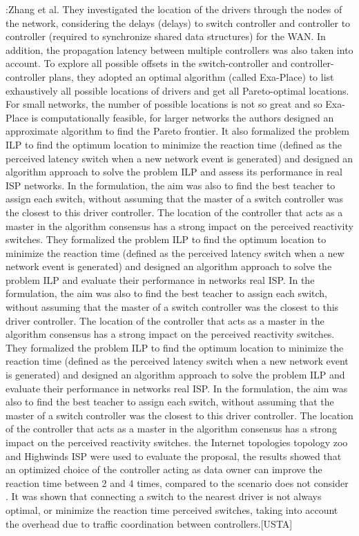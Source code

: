 \documentclass[a4paper,10pt]{article}
\begin{document}
\cite{ZhGi17}:Zhang et al. They investigated the location of the drivers through the nodes of the network, considering the delays (delays) to switch controller and controller to controller (required to synchronize shared data structures) for the WAN. In addition, the propagation latency between multiple controllers was also taken into account. To explore all possible offsets in the switch-controller and controller-controller plans, they adopted an optimal algorithm (called Exa-Place) to list exhaustively all possible locations of drivers and get all Pareto-optimal locations. For small networks, the number of possible locations is not so great and so Exa-Place is computationally feasible, for larger networks the authors designed an approximate algorithm to find the Pareto frontier. It also formalized the problem ILP to find the optimum location to minimize the reaction time (defined as the perceived latency switch when a new network event is generated) and designed an algorithm approach to solve the problem ILP and assess its performance in real ISP networks. In the formulation, the aim was also to find the best teacher to assign each switch, without assuming that the master of a switch controller was the closest to this driver controller. The location of the controller that acts as a master in the algorithm consensus has a strong impact on the perceived reactivity switches. They formalized the problem ILP to find the optimum location to minimize the reaction time (defined as the perceived latency switch when a new network event is generated) and designed an algorithm approach to solve the problem ILP and evaluate their performance in networks real ISP. In the formulation, the aim was also to find the best teacher to assign each switch, without assuming that the master of a switch controller was the closest to this driver controller. The location of the controller that acts as a master in the algorithm consensus has a strong impact on the perceived reactivity switches. They formalized the problem ILP to find the optimum location to minimize the reaction time (defined as the perceived latency switch when a new network event is generated) and designed an algorithm approach to solve the problem ILP and evaluate their performance in networks real ISP. In the formulation, the aim was also to find the best teacher to assign each switch, without assuming that the master of a switch controller was the closest to this driver controller. The location of the controller that acts as a master in the algorithm consensus has a strong impact on the perceived reactivity switches.
the Internet topologies topology zoo and Highwinds ISP were used to evaluate the proposal, the results showed that an optimized choice of the controller acting as data owner can improve the reaction time between 2 and 4 times, compared to the scenario does not consider . It was shown that connecting a switch to the nearest driver is not always optimal, or minimize the reaction time perceived switches, taking into account the overhead due to traffic coordination between controllers.[USTA]
\end{document}
